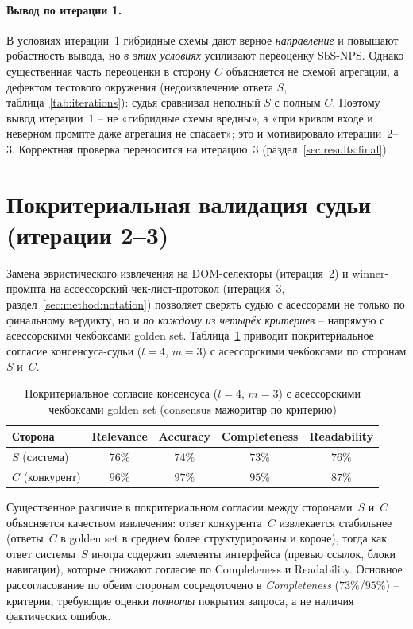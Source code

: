 \paragraph{Вывод по итерации 1.}
В условиях итерации~1 гибридные схемы дают верное \emph{направление} и
повышают робастность вывода, но \emph{в этих условиях} усиливают
переоценку $\mathrm{SbS\text{-}NPS}$.
Однако существенная часть переоценки в сторону $C$ объясняется не схемой
агрегации, а дефектом тестового окружения (недоизвлечение ответа $S$,
таблица~\ref{tab:iterations}): судья сравнивал неполный $S$ с полным $C$.
Поэтому вывод итерации~1 -- не «гибридные схемы вредны», а «при кривом
входе и неверном промпте даже агрегация не спасает»; это и мотивировало
итерации~2--3. Корректная проверка переносится на итерацию~3
(раздел~\ref{sec:results:final}).

\section{Покритериальная валидация судьи (итерации 2--3)}
\label{sec:results:percrit}

Замена эвристического извлечения на DOM-селекторы (итерация~2) и
winner-промпта на ассессорский чек-лист-протокол (итерация~3,
раздел~\ref{sec:method:notation}) позволяет сверять судью с асессорами
не только по финальному вердикту, но и \emph{по каждому из четырёх
критериев} -- напрямую с асессорскими чекбоксами golden set.
Таблица~\ref{tab:percrit-agreement} приводит покритериальное согласие
консенсуса-судьи ($l{=}4$, $m{=}3$) с асессорскими чекбоксами по
сторонам $S$ и~$C$.

\begin{table}[htbp]
    \centering
    \caption{Покритериальное согласие консенсуса ($l{=}4$, $m{=}3$) с
    асессорскими чекбоксами golden set (consensus мажоритар по критерию)}
    \label{tab:percrit-agreement}
    \begin{tabular}{lcccc}
        \toprule
        Сторона & Relevance & Accuracy & Completeness & Readability \\
        \midrule
        $S$ (система) & $76\%$ & $74\%$ & $73\%$ & $76\%$ \\
        $C$ (конкурент) & $96\%$ & $97\%$ & $95\%$ & $87\%$ \\
        \bottomrule
    \end{tabular}
\end{table}

Существенное различие в покритериальном согласии между сторонами~$S$
и~$C$ объясняется качеством извлечения: ответ конкурента~$C$
извлекается стабильнее (ответы~$C$ в golden set в среднем более
структурированы и короче), тогда как ответ системы~$S$ иногда
содержит элементы интерфейса (превью ссылок, блоки навигации),
которые снижают согласие по Completeness и Readability.
Основное рассогласование по обеим сторонам сосредоточено в
\emph{Completeness} ($73\%$/$95\%$) -- критерии, требующие оценки
 \emph{полноты} покрытия запроса, а не наличия фактических ошибок.

